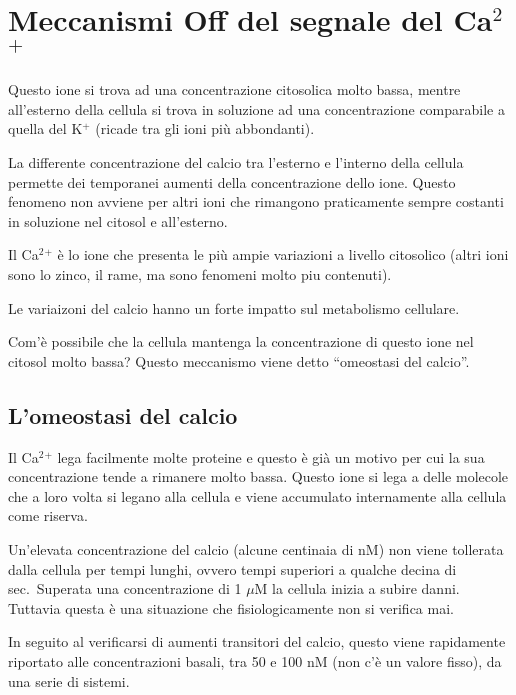 \documentclass[]{article}
\date{}
\begin{document}
\section{\texorpdfstring{Meccanismi Off del segnale del
Ca\(^2\)\(^+\)}{Meccanismi Off del segnale del Ca\^{}2\^{}+}}\label{meccanismi-off-del-segnale-del-ca2}

Questo ione si trova ad una concentrazione citosolica molto bassa,
mentre all'esterno della cellula si trova in soluzione ad una
concentrazione comparabile a quella del K\(^+\) (ricade tra gli ioni più
abbondanti).

La differente concentrazione del calcio tra l'esterno e l'interno della
cellula permette dei temporanei aumenti della concentrazione dello ione.
Questo fenomeno non avviene per altri ioni che rimangono praticamente
sempre costanti in soluzione nel citosol e all'esterno.

Il Ca\(^2\)\(^+\) è lo ione che presenta le più ampie variazioni a
livello citosolico (altri ioni sono lo zinco, il rame, ma sono fenomeni
molto piu contenuti).

Le variaizoni del calcio hanno un forte impatto sul metabolismo
cellulare.

Com'è possibile che la cellula mantenga la concentrazione di questo ione
nel citosol molto bassa? Questo meccanismo viene detto ``omeostasi del
calcio''.

\subsection{L'omeostasi del calcio}\label{lomeostasi-del-calcio}

Il Ca\(^2\)\(^+\) lega facilmente molte proteine e questo è già un
motivo per cui la sua concentrazione tende a rimanere molto bassa.
Questo ione si lega a delle molecole che a loro volta si legano alla
cellula e viene accumulato internamente alla cellula come riserva.

Un'elevata concentrazione del calcio (alcune centinaia di nM) non viene
tollerata dalla cellula per tempi lunghi, ovvero tempi superiori a
qualche decina di sec.~Superata una concentrazione di 1 \(\mu\)M la
cellula inizia a subire danni. Tuttavia questa è una situazione che
fisiologicamente non si verifica mai.

In seguito al verificarsi di aumenti transitori del calcio, questo viene
rapidamente riportato alle concentrazioni basali, tra 50 e 100 nM (non
c'è un valore fisso), da una serie di sistemi.
\end{document}
